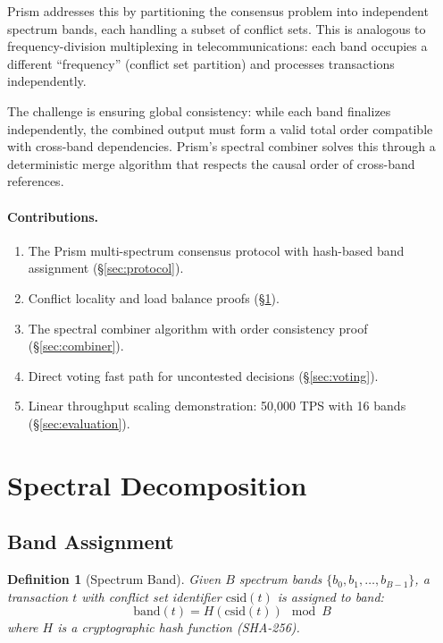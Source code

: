 \documentclass[11pt,a4paper]{article}
\newtheorem{definition}{Definition}[section]
\begin{document}
Prism addresses this by partitioning the consensus problem into independent spectrum
bands, each handling a subset of conflict sets. This is analogous to frequency-division
multiplexing in telecommunications: each band occupies a different ``frequency''
(conflict set partition) and processes transactions independently.

The challenge is ensuring global consistency: while each band finalizes independently,
the combined output must form a valid total order compatible with cross-band dependencies.
Prism's spectral combiner solves this through a deterministic merge algorithm that
respects the causal order of cross-band references.

\paragraph{Contributions.}
\begin{enumerate}[nosep]
\item The Prism multi-spectrum consensus protocol with hash-based band assignment (\S\ref{sec:protocol}).
\item Conflict locality and load balance proofs (\S\ref{sec:partition}).
\item The spectral combiner algorithm with order consistency proof (\S\ref{sec:combiner}).
\item Direct voting fast path for uncontested decisions (\S\ref{sec:voting}).
\item Linear throughput scaling demonstration: 50,000 TPS with 16 bands (\S\ref{sec:evaluation}).
\end{enumerate}

\section{Spectral Decomposition}
\label{sec:partition}

\subsection{Band Assignment}

\begin{definition}[Spectrum Band]
Given $B$ spectrum bands $\{b_0, b_1, \ldots, b_{B-1}\}$, a transaction $t$ with
conflict set identifier $\text{csid}(t)$ is assigned to band:
\[
\text{band}(t) = H(\text{csid}(t)) \mod B
\]
where $H$ is a cryptographic hash function (SHA-256).
\end{definition}
\end{document}
